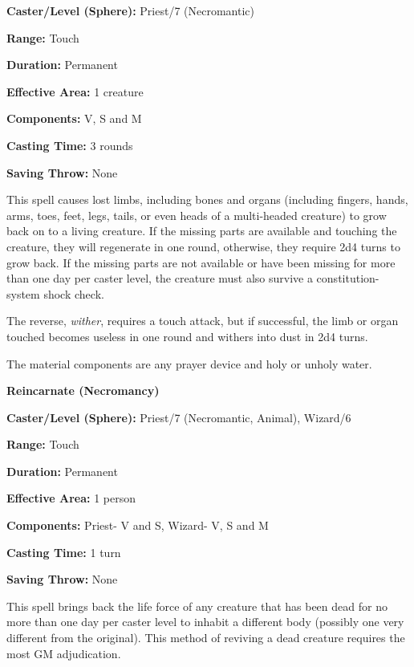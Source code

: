 \begin{multicols}{2}
\begin{minipage}{\columnwidth}
\noindent \textbf{Caster/Level (Sphere):} Priest/7 (Necromantic)

\noindent \textbf{Range:} Touch

\noindent \textbf{Duration:} Permanent

\noindent \textbf{Effective Area:} 1 creature

\noindent \textbf{Components:} V, S and M

\noindent \textbf{Casting Time:} 3 rounds

\noindent \textbf{Saving Throw:} None

\end{minipage}

This spell causes lost limbs, including bones and organs (including fingers, hands, arms, toes, feet, legs, tails, or even heads of a multi-headed creature) to grow back on to a living creature.  If the missing parts are available and touching the creature, they will regenerate in one round, otherwise, they require 2d4 turns to grow back.  If the missing parts are not available or have been missing for more than one day per caster level, the creature must also survive a constitution-system shock check.  

The reverse, \textit{wither}, requires a touch attack, but if successful, the limb or organ touched becomes useless in one round and withers into dust in 2d4 turns.

The material components are any prayer device and holy or unholy water.

\vspace{1em}

\noindent
\begin{minipage}{\columnwidth}

\noindent \textbf{Reincarnate (Necromancy)}

\noindent \textbf{Caster/Level (Sphere):} Priest/7 (Necromantic, Animal), Wizard/6

\noindent \textbf{Range:} Touch

\noindent \textbf{Duration:} Permanent

\noindent \textbf{Effective Area:} 1 person

\noindent \textbf{Components:} Priest- V and S, Wizard- V, S and M

\noindent \textbf{Casting Time:} 1 turn

\noindent \textbf{Saving Throw:} None

\end{minipage}

This spell brings back the life force of any creature that has been dead for no more than one day per caster level to inhabit a different body (possibly one very different from the original).  This method of reviving a dead creature requires the most GM adjudication.


\end{multicols}
